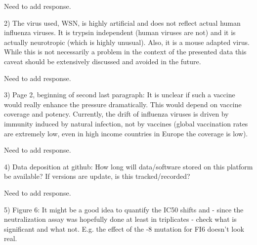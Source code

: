 \documentclass[11pt, oneside]{article}   	%
\begin{document}
{\color{red}
Need to add response.}

2) The virus used, WSN, is highly artificial and does not reflect actual human influenza viruses. It is trypsin independent (human viruses are not) and it is actually neurotropic (which is highly unusual). Also, it is a mouse adapted virus. While this is not necessarily a problem in the context of the presented data this caveat should be extensively discussed and avoided in the future.

{\color{red}
Need to add response.}

3) Page 2, beginning of second last paragraph: It is unclear if such a vaccine would really enhance the pressure dramatically. This would depend on vaccine coverage and potency. Currently, the drift of influenza viruses is driven by immunity induced by natural infection, not by vaccines (global vaccination rates are extremely low, even in high income countries in Europe the coverage is low).

{\color{red}
Need to add response.}

4) Data deposition at github: How long will data/software stored on this platform be available? If versions are update, is this tracked/recorded? 

{\color{red}
Need to add response.}

5) Figure 6: It might be a good idea to quantify the IC50 shifts and - since the neutralization assay was hopefully done at least in triplicates - check what is significant and what not. E.g. the effect of the -8 mutation for FI6 doesn't look real. 
\end{document}
